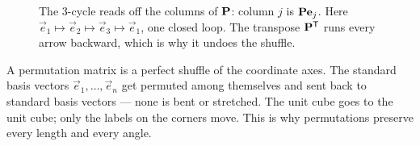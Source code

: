 \begin{figure}[H]
\centering
{}
\caption{The $3$-cycle reads off the columns of $\mathbf{P}$: column $j$ is $\mathbf{P}\mathbf{e}_j$. Here
$\vec{e}_1\mapsto\vec{e}_2\mapsto\vec{e}_3\mapsto\vec{e}_1$, one closed loop. The transpose
$\mathbf{P}^{\mathsf{T}}$ runs every arrow backward, which is why it undoes the shuffle.}
\label{ch10:fig-cycle}
\end{figure}

\begin{intuitionbox}
A permutation matrix is a perfect shuffle of the coordinate axes. The standard basis vectors
$\vec{e}_1,\dots,\vec{e}_n$ get permuted among themselves and sent back to standard basis vectors ---
none is bent or stretched. The unit cube goes to the unit cube; only the labels on the corners move.
This is why permutations preserve every length and every angle.
\end{intuitionbox}

